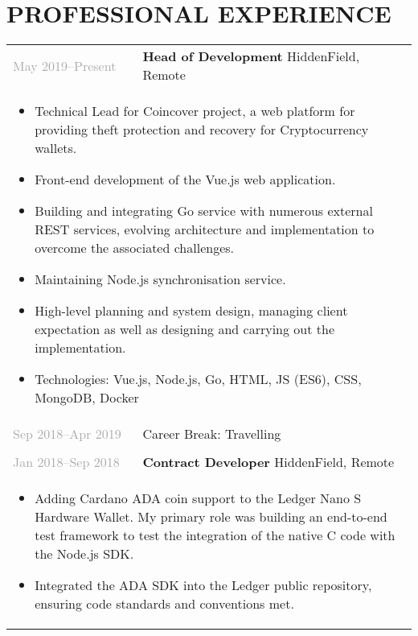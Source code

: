 \documentclass{article}
\newenvironment{exptable}{
  \begin{longtable}{lp{0.8\textwidth}}
  }{
  \end{longtable}
}
\begin{document}
  \section*{PROFESSIONAL EXPERIENCE}
    \begin{exptable}
      \textcolor{darkgray}{May 2019--Present}  & \textbf{Head of Development} HiddenField, Remote \\
      \multicolumn{2}{p{\textwidth}}{
        \begin{itemize}
          \item Technical Lead for Coincover project, a web platform for providing theft protection and recovery for Cryptocurrency wallets.
          \item Front-end development of the Vue.js web application.
          \item Building and integrating Go service with numerous external REST services, evolving architecture and implementation to overcome the associated challenges.
          \item Maintaining Node.js synchronisation service.
          \item High-level planning and system design, managing client expectation as well as designing and carrying out the implementation.
        \end{itemize}

        \vspace{1em}

        \begin{itemize}[leftmargin=1em]
          \item[] Technologies: Vue.js, Node.js, Go, HTML, JS (ES6), CSS, MongoDB, Docker
        \end{itemize}
      } \\

      \textcolor{darkgray}{Sep 2018--Apr 2019} & Career Break: Travelling \\
      \multicolumn{2}{p{\textwidth}}{} \\

      \textcolor{darkgray}{Jan 2018--Sep 2018} & \textbf{Contract Developer} HiddenField, Remote \\
      \multicolumn{2}{p{\textwidth}}{
        \begin{itemize}
          \item Adding Cardano ADA coin support to the Ledger Nano S Hardware Wallet. My primary role was building an end-to-end test framework to test the integration of the native C code with the Node.js SDK.
          \item Integrated the ADA SDK into the Ledger public repository, ensuring code standards and conventions met.
        \end{itemize}

}
\end{exptable}
\end{document}
